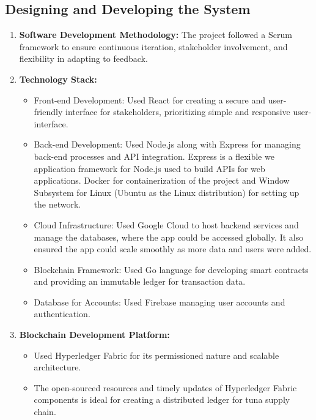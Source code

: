 \subsection{Designing and Developing the System}

\begin{enumerate}
	\item \textbf{Software Development Methodology:} The project followed a Scrum framework to ensure continuous iteration, stakeholder involvement, and flexibility in adapting to feedback.
	\item \textbf{Technology Stack:} 
	\begin{itemize}
		\item Front-end Development: Used React for creating a secure and user-friendly interface for stakeholders, prioritizing simple and responsive user-interface.
		\item Back-end Development: Used Node.js along with Express for managing back-end processes and API integration. Express is a flexible we application framework for Node.js used to build APIs for web applications. Docker for containerization of the project and Window Subsystem for Linux (Ubuntu as the Linux distribution) for setting up the network.
		\item Cloud Infrastructure: Used Google Cloud to host backend services and manage the databases, where the app could be accessed globally. It also ensured the app could scale smoothly as more data and users were added.  
		\item Blockchain Framework: Used Go language for developing smart contracts and providing an immutable ledger for transaction data.
		\item Database for Accounts: Used Firebase managing user accounts and authentication.
	\end{itemize}
	\item \textbf{Blockchain Development Platform:} 
	\begin{itemize}
		\item Used Hyperledger Fabric for its permissioned nature and scalable architecture.
		\item The open-sourced resources and timely updates of Hyperledger Fabric components is ideal for creating a distributed ledger for tuna supply chain.
	\end{itemize}
\end{enumerate}

